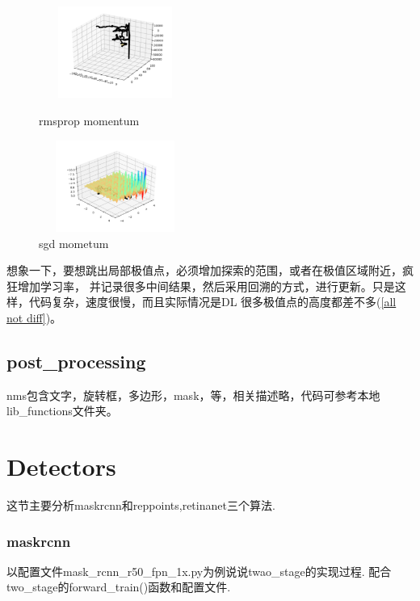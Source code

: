 \documentclass[UTF8]{ctexart}
\begin{document}
\begin{figure}[htbp]
	\centering
	\begin{minipage}[t]{0.48\textwidth}
	\centering
	\includegraphics[width=5cm, height=3cm]{./pic/rmsprop_momentum.png}
	\caption{rmsprop momentum}
	\end{minipage}
	\begin{minipage}[t]{0.48\textwidth}
	\centering
	\includegraphics[width=5cm,height=3cm]{./pic/sgd_mometum.png}
	\caption{sgd mometum}
	\label{decent curve}
	\end{minipage}
\end{figure}

想象一下，要想跳出局部极值点，必须增加探索的范围，或者在极值区域附近，疯狂增加学习率，
并记录很多中间结果，然后采用回溯的方式，进行更新。只是这样，代码复杂，速度很慢，而且实际情况是DL
很多极值点的高度都差不多(\ref{all not diff})。


\subsection{post\_processing}
nms包含文字，旋转框，多边形，mask，等，相关描述略，代码可参考本地lib\_functions文件夹。



\section{Detectors}

这节主要分析maskrcnn和reppoints,retinanet三个算法.

\subsubsection{maskrcnn}
\label{maskrcnn}
以配置文件mask\_rcnn\_r50\_fpn\_1x.py为例说说twao\_stage的实现过程.
配合two\_stage的forward\_train()函数和配置文件.
\end{document}
